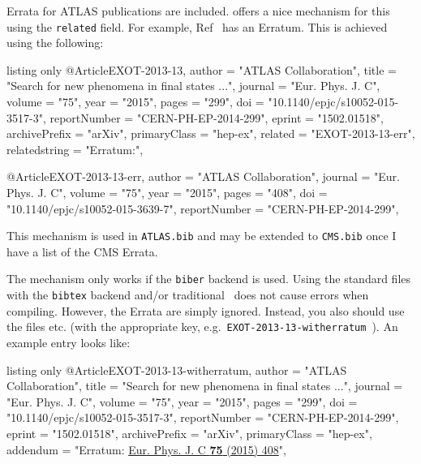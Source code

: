 \documentclass[UKenglish, texlive=2016]{atlasdoc}
\begin{document}
 Errata for ATLAS publications are included.
 offers a nice mechanism for this using the \texttt{related} field.
For example, Ref~\cite{EXOT-2013-13} has an Erratum.
This is achieved using the following:
\begin{tcblisting}{listing only}
@Article{EXOT-2013-13,
    author         = "{ATLAS Collaboration}",
    title          = "{Search for new phenomena in final states ...}",
    journal        = "Eur. Phys. J. C",
    volume         = "75",
    year           = "2015",
    pages          = "299",
    doi            = "10.1140/epjc/s10052-015-3517-3",
    reportNumber   = "CERN-PH-EP-2014-299",
    eprint         = "1502.01518",
    archivePrefix  = "arXiv",
    primaryClass   = "hep-ex",
    related        = "EXOT-2013-13-err",
    relatedstring  = "Erratum:",
}

@Article{EXOT-2013-13-err,
    author         = "{ATLAS Collaboration}",
    journal        = "Eur. Phys. J. C",
    volume         = "75",
    year           = "2015",
    pages          = "408",
    doi            = "10.1140/epjc/s10052-015-3639-7",
    reportNumber   = "CERN-PH-EP-2014-299",
}
\end{tcblisting}

This mechanism is used in \texttt{ATLAS.bib} and may be extended to \texttt{CMS.bib} once
I have a list of the CMS Errata.

The mechanism only works if the \texttt{biber} backend is used.
Using the standard files with the \texttt{bibtex} backend and/or traditional \BibTeX\ does not cause errors when compiling.
However, the Errata are simply ignored.
Instead, you also should use the files  etc.
(with the appropriate key, e.g.~\texttt{EXOT-2013-13-witherratum}~\cite{EXOT-2013-13-witherratum}).
An example entry looks like:
\begin{tcblisting}{listing only}
@Article{EXOT-2013-13-witherratum,
    author         = "{ATLAS Collaboration}",
    title          = "{Search for new phenomena in final states ...}",
    journal        = "Eur. Phys. J. C",
    volume         = "75",
    year           = "2015",
    pages          = "299",
    doi            = "10.1140/epjc/s10052-015-3517-3",
    reportNumber   = "CERN-PH-EP-2014-299",
    eprint         = "1502.01518",
    archivePrefix  = "arXiv",
    primaryClass   = "hep-ex",
    addendum       = "Erratum: \href{http://dx.doi.org/10.1140/epjc/s10052-015-3639-7}{Eur. Phys. J. C \textbf{75} (2015) 408}",
}
\end{tcblisting}
\end{document}
